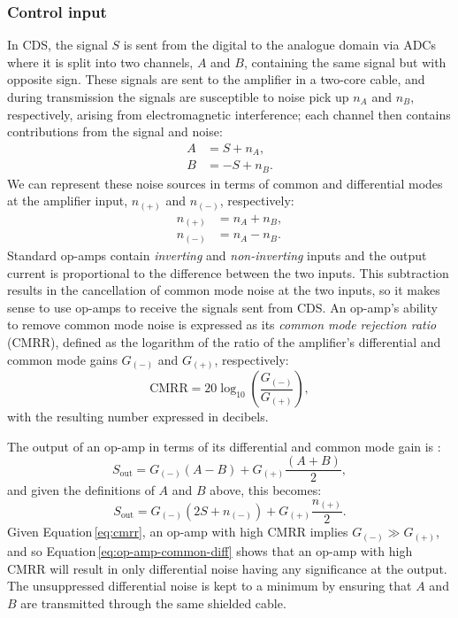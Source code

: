 \subsubsection{Control input}
In \gls{CDS}, the signal $S$ is sent from the digital to the analogue domain via \glspl{ADC} where it is split into two channels, $A$ and $B$, containing the same signal but with opposite sign. These signals are sent to the amplifier in a two-core cable, and during transmission the signals are susceptible to noise pick up $n_{A}$ and $n_{B}$, respectively, arising from electromagnetic interference; each channel then contains contributions from the signal and noise:
\begin{align}
  A &= S + n_{A}, \\
  B &= -S + n_{B}.
\end{align}
We can represent these noise sources in terms of common and differential modes at the amplifier input, $n_{\left(+\right)}$ and $n_{\left(-\right)}$, respectively:
\begin{align}
  n_{\left(+\right)} &= n_{A} + n_{B}, \\
  n_{\left(-\right)} &= n_{A} - n_{B}.
\end{align}
Standard op-amps contain \emph{inverting} and \emph{non-inverting} inputs and the output current is proportional to the difference between the two inputs. This subtraction results in the cancellation of common mode noise at the two inputs, so it makes sense to use op-amps to receive the signals sent from \gls{CDS}. An op-amp's ability to remove common mode noise is expressed as its \emph{common mode rejection ratio} (\gls{CMRR}), defined as the logarithm of the ratio of the amplifier's differential and common mode gains $G_{\left( - \right)}$ and $G_{\left( + \right)}$, respectively:
\begin{equation}
  \label{eq:cmrr}
  \text{CMRR} = 20 \log_{10} \left( \frac{G_{\left(-\right)}}{G_{\left(+\right)}} \right),
\end{equation}
with the resulting number expressed in decibels.

The output of an op-amp in terms of its differential and common mode gain is \cite{Horowitz2015}:
\begin{equation}
  S_{\text{out}} = G_{\left(-\right)} \left(A - B\right) + G_{\left(+\right)} \frac{\left(A + B\right)}{2},
\end{equation}
and given the definitions of $A$ and $B$ above, this becomes:
\begin{equation}
  \label{eq:op-amp-common-diff}
  S_{\text{out}} = G_{\left(-\right)} \left(2S + n_{\left(-\right)}\right) + G_{\left(+\right)} \frac{n_{\left(+\right)}}{2}.
\end{equation}
Given Equation\,\ref{eq:cmrr}, an op-amp with high \gls{CMRR} implies $G_{\left(-\right)} \gg G_{\left(+\right)}$, and so Equation\,\ref{eq:op-amp-common-diff} shows that an op-amp with high \gls{CMRR} will result in only differential noise having any significance at the output. The unsuppressed differential noise is kept to a minimum by ensuring that $A$ and $B$ are transmitted through the same shielded cable.

